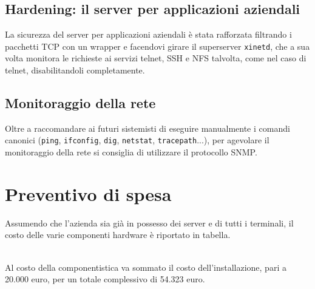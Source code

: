 \documentclass[a4paper,11pt]{article}
\def\code#1{\texttt{#1}}
\begin{document}
\subsection{Hardening: il server per applicazioni aziendali}
La sicurezza del server per applicazioni aziendali è stata rafforzata filtrando i pacchetti TCP con un wrapper e facendovi girare il superserver \code{xinetd}, che a sua volta monitora le richieste ai servizi telnet, SSH e NFS talvolta, come nel caso di telnet, disabilitandoli completamente.
\subsection{Monitoraggio della rete}
Oltre a raccomandare ai futuri sistemisti di eseguire manualmente i comandi canonici (\code{ping}, \code{ifconfig}, \code{dig}, \code{netstat}, \code{tracepath}...), per agevolare il monitoraggio della rete si consiglia di utilizzare il protocollo SNMP.
\newpage
\section{Preventivo di spesa}
Assumendo che l'azienda sia già in possesso dei server e di tutti i terminali, il costo delle varie componenti hardware è riportato in tabella.
\begin{table}[H]
\centering
\label{costo componentistica}
\caption{Costo delle componenti hardware}
\end{table}
\ \\Al costo della componentistica va sommato il costo dell'installazione, pari a 20.000 euro, per un totale complessivo di 54.323 euro.
\end{document}
